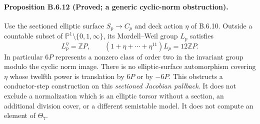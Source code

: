 

\paragraph{Proposition B.6.12 (Proved; a generic cyclic-norm obstruction).}
Use the sectioned elliptic surface $S_p\to C_p$ and deck action
$\eta$ of B.6.10. Outside a countable subset of
$\mathbb P^1\setminus\{0,1,\infty\}$, its Mordell--Weil group
$L_p$ satisfies
\[
 L_p^\eta=\mathbb ZP,\qquad
 (1+\eta+\cdots+\eta^{11})L_p=12\mathbb ZP.
 \tag{B.6.19}
\]
In particular $6P$ represents a nonzero class of order two
in the invariant group modulo the cyclic norm image.
There is no elliptic-surface automorphism covering $\eta$
whose twelfth power is translation by $6P$ or by $-6P$.
This obstructs a conductor-step construction on this
\emph{sectioned Jacobian pullback}. It does not exclude a
normalization which is an elliptic torsor without a section,
an additional division cover, or a different semistable model.
It does not compute an element of $\Theta_7$.

